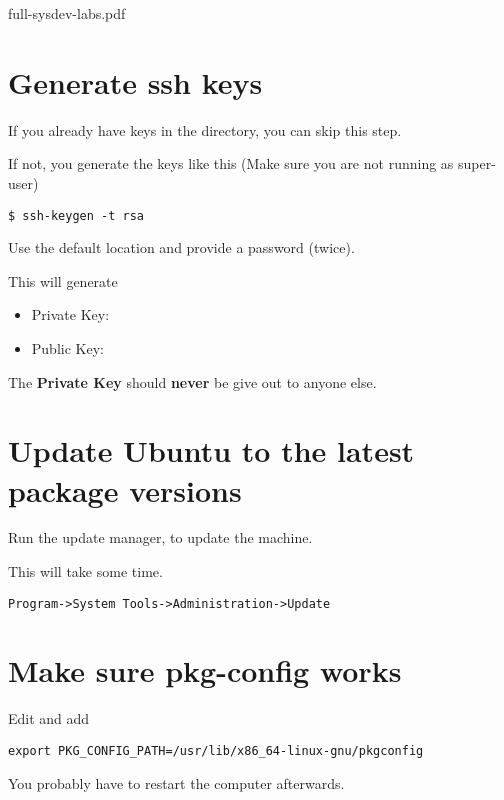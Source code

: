 \clearpage full-sysdev-labs.pdf 
\section{Generate ssh keys}

If you already have  keys in the  directory, 
you can skip this step.

If not, you generate the keys like this (Make sure you are not running as super-user)

\begin{verbatim}
$ ssh-keygen -t rsa
\end{verbatim}

Use the default location and provide a password (twice).

This will generate 

\begin{itemize}

\item Private Key: 

\item Public Key: 

\end{itemize}

The {\bf Private Key} should {\bf never} be give out to anyone else.

\section{Update Ubuntu to the latest package versions}

Run the update manager, to update the machine.

This will take some time.

\begin{verbatim}
Program->System Tools->Administration->Update
\end{verbatim}

\section{Make sure pkg-config works}

Edit  and add

\begin{verbatim}
export PKG_CONFIG_PATH=/usr/lib/x86_64-linux-gnu/pkgconfig
\end{verbatim}



You probably have to restart the computer afterwards.

